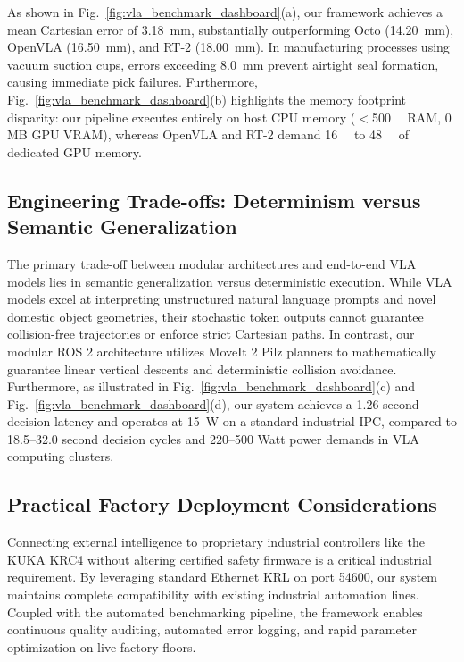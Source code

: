 \documentclass{svproc}
\begin{document}
As shown in Fig.~\ref{fig:vla_benchmark_dashboard}(a), our framework achieves a mean Cartesian error of \SI{3.18}{\milli\meter}, substantially outperforming Octo (\SI{14.20}{\milli\meter}), OpenVLA (\SI{16.50}{\milli\meter}), and RT-2 (\SI{18.00}{\milli\meter}). In manufacturing processes using vacuum suction cups, errors exceeding \SI{8.0}{\milli\meter} prevent airtight seal formation, causing immediate pick failures. Furthermore, Fig.~\ref{fig:vla_benchmark_dashboard}(b) highlights the memory footprint disparity: our pipeline executes entirely on host CPU memory ($<$\SI{500}{\mega\byte} RAM, 0 MB GPU VRAM), whereas OpenVLA and RT-2 demand \SI{16}{\giga\byte} to \SI{48}{\giga\byte} of dedicated GPU memory.

\subsection{Engineering Trade-offs: Determinism versus Semantic Generalization}
The primary trade-off between modular architectures and end-to-end VLA models lies in semantic generalization versus deterministic execution. While VLA models excel at interpreting unstructured natural language prompts and novel domestic object geometries, their stochastic token outputs cannot guarantee collision-free trajectories or enforce strict Cartesian paths. In contrast, our modular ROS 2 architecture utilizes MoveIt 2 Pilz planners to mathematically guarantee linear vertical descents and deterministic collision avoidance. Furthermore, as illustrated in Fig.~\ref{fig:vla_benchmark_dashboard}(c) and Fig.~\ref{fig:vla_benchmark_dashboard}(d), our system achieves a 1.26-second decision latency and operates at \SI{15}{\watt} on a standard industrial IPC, compared to 18.5--32.0 second decision cycles and 220--500 Watt power demands in VLA computing clusters.

\subsection{Practical Factory Deployment Considerations}
Connecting external intelligence to proprietary industrial controllers like the KUKA KRC4 without altering certified safety firmware is a critical industrial requirement. By leveraging standard Ethernet KRL on port 54600, our system maintains complete compatibility with existing industrial automation lines. Coupled with the automated benchmarking pipeline, the framework enables continuous quality auditing, automated error logging, and rapid parameter optimization on live factory floors.
\end{document}
